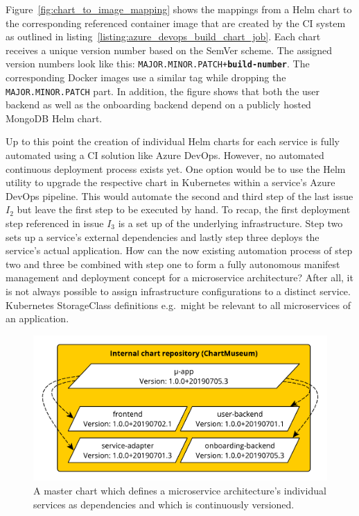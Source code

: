 Figure~\ref{fig:chart_to_image_mapping} shows the mappings from a Helm chart to
the corresponding referenced container image that are created by the \ac{CI}
system as outlined in listing~\ref{listing:azure_devops_build_chart_job}. Each
chart receives a unique version number based on the SemVer scheme. The assigned
version numbers look like this:
\texttt{MAJOR.MINOR.PATCH+\textbf{build-number}}. The corresponding Docker
images use a similar tag while dropping the \texttt{MAJOR.MINOR.PATCH} part. In
addition, the figure shows that both the user backend as well as the onboarding
backend depend on a publicly hosted MongoDB Helm chart.

Up to this point the creation of individual Helm charts for each service is
fully automated using a \ac{CI} solution like Azure DevOps. However, no
automated continuous deployment process exists yet. One option would be to use
the Helm utility to upgrade the respective chart in Kubernetes within a
service's Azure DevOps pipeline. This would automate the second and third step
of the last issue $I_2$ but leave the first step to be executed by hand. To
recap, the first deployment step referenced in issue $I_3$ is a set up of the
underlying infrastructure. Step two sets up a service's external dependencies
and lastly step three deploys the service's actual application.  How can the
now existing automation process of step two and three be combined with step one
to form a fully autonomous manifest management and deployment concept for a
microservice architecture? After all, it is not always possible to assign
infrastructure configurations to a distinct service. Kubernetes StorageClass
definitions e.g.\ might be relevant to all microservices of an application.

\begin{figure}[H]
\begin{center}
  \includegraphics[scale=0.7]{images/figures/master_chart.pdf}
\end{center}
\caption{A master chart which defines a microservice architecture's individual
services as dependencies and which is continuously versioned.}%
\label{fig:master_chart}
\end{figure}

